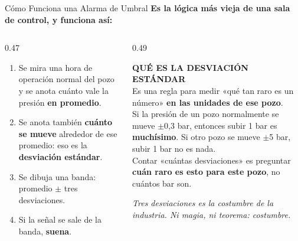 \documentclass[aspectratio=169, 11pt]{beamer}
\begin{document}
\begin{frame}[shrink=8]{Cómo Funciona una Alarma de Umbral}
  \vspace{-4pt}
  {\small\color{arcaDark}\bfseries
   Es la lógica más vieja de una sala de control, y funciona así:}
  \vspace{7pt}
  \begin{columns}[T]
    \begin{column}{0.47\textwidth}
      {\footnotesize\color{textMuted}
      \begin{enumerate}\setlength{\itemsep}{5pt}
        \item Se mira una hora de operación normal del pozo y se anota
              cuánto vale la presión \textbf{en promedio}.
        \item Se anota también \textbf{cuánto se mueve} alrededor de ese
              promedio: eso es la \textbf{desviación estándar}.
        \item Se dibuja una banda: promedio $\pm$ tres desviaciones.
        \item Si la señal se sale de la banda, \textbf{suena}.
      \end{enumerate}}
    \end{column}
    \begin{column}{0.49\textwidth}
      \begin{tcolorbox}[colback=arcaGray, colframe=codeBlue, boxrule=0pt, leftrule=3pt,
        arc=3pt, left=6pt, right=6pt, top=5pt, bottom=5pt]
        {\scriptsize\color{codeBlue}\bfseries\faRuler\hspace{4pt}QUÉ ES LA DESVIACIÓN ESTÁNDAR}\\[4pt]
        {\scriptsize\color{textMuted}
         Es una regla para medir «qué tan raro es un número» \textbf{en las
         unidades de ese pozo}.\\[4pt]
         Si la presión de un pozo normalmente se mueve $\pm$0{,}3 bar,
         entonces subir 1 bar es \textbf{muchísimo}. Si otro pozo se mueve
         $\pm$5 bar, subir 1 bar no es nada.\\[4pt]
         Contar «cuántas desviaciones» es preguntar \textbf{cuán raro es esto
         para este pozo}, no cuántos bar son.}
      \end{tcolorbox}
      \vspace{4pt}
      {\scriptsize\color{arcaDark}\itshape
        Tres desviaciones es la costumbre de la industria. Ni magia,
        ni teorema: costumbre.}
    \end{column}
  \end{columns}
\end{frame}
\end{document}
